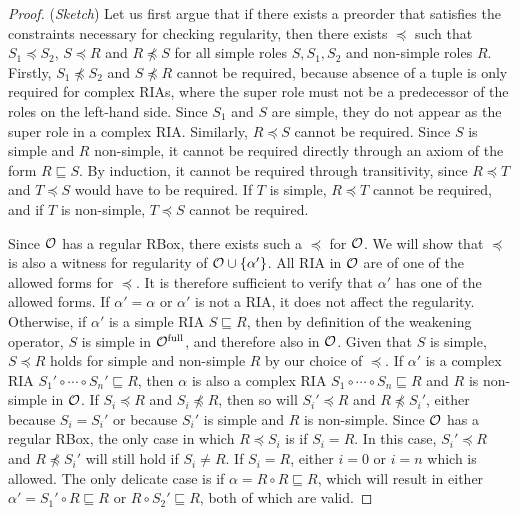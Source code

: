 \begin{proof}(\emph{Sketch}) \label{proof:regularity}
  Let us first argue that if there exists a preorder that satisfies the constraints necessary for checking regularity, then there exists $\preceq$ such that $S_1 \preceq S_2$, $S \preceq R$ and $R \not\preceq S$ for all simple roles $S, S_1, S_2$ and non-simple roles $R$. Firstly, $S_1 \not\preceq S_2$ and $S \not\preceq R$ cannot be required, because absence of a tuple is only required for complex RIAs, where the super role must not be a predecessor of the roles on the left-hand side. Since $S_1$ and $S$ are simple, they do not appear as the super role in a complex RIA. Similarly, $R \preceq S$ cannot be required. Since $S$ is simple and $R$ non-simple, it cannot be required directly through an axiom of the form $R \sqsubseteq S$. By induction, it cannot be required through transitivity, since $R \preceq T$ and $T \preceq S$ would have to be required. If $T$ is simple, $R \preceq T$ cannot be required, and if $T$ is non-simple, $T \preceq S$ cannot be required.

  Since $\mathcal{O}$ has a regular RBox, there exists such a $\preceq$ for $\mathcal{O}$. We will show that $\preceq$ is also a witness for regularity of $\mathcal{O} \cup \{ \alpha' \}$. All RIA in $\mathcal{O}$ are of one of the allowed forms for $\preceq$. It is therefore sufficient to verify that $\alpha'$ has one of the allowed forms.
  If $\alpha' = \alpha$ or $\alpha'$ is not a RIA, it does not affect the regularity.
  Otherwise, if $\alpha'$ is a simple RIA $S \sqsubseteq R$, then by definition of the weakening operator, $S$ is simple in ${\mathcal{O}^\textnormal{full}}$, and therefore also in $\mathcal{O}$. Given that $S$ is simple, $S \preceq R$ holds for simple and non-simple $R$ by our choice of $\preceq$.
  If $\alpha'$ is a complex RIA $S_1' \circ \cdots \circ S_n' \sqsubseteq R$, then $\alpha$ is also a complex RIA $S_1 \circ \cdots \circ S_n \sqsubseteq R$ and $R$ is non-simple in $\mathcal{O}$. If $S_i \preceq R$ and $S_i \not\preceq R$, then so will $S_i' \preceq R$ and $R \not\preceq S_i'$, either because $S_i = S_i'$ or because $S_i'$ is simple and $R$ is non-simple. Since $\mathcal{O}$ has a regular RBox, the only case in which $R \preceq S_i$ is if $S_i = R$. In this case, $S_i' \preceq R$ and $R \not\preceq S_i'$ will still hold if $S_i \not= R$. If $S_i = R$, either $i = 0$ or $i = n$ which is allowed. The only delicate case is if $\alpha = R \circ R \sqsubseteq R$, which will result in either $\alpha' = S_1' \circ R \sqsubseteq R$ or $R \circ S_2' \sqsubseteq R$, both of which are valid.
\end{proof}


